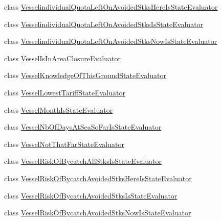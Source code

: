 \begin{DoxyCompactItemize}
\item 
class \mbox{\hyperlink{classdtree_1_1vessels_1_1_vesselindividual_quota_left_on_avoided_stks_here_is_state_evaluator}{Vesselindividual\+Quota\+Left\+On\+Avoided\+Stks\+Here\+Is\+State\+Evaluator}}
\item 
class \mbox{\hyperlink{classdtree_1_1vessels_1_1_vesselindividual_quota_left_on_avoided_stks_is_state_evaluator}{Vesselindividual\+Quota\+Left\+On\+Avoided\+Stks\+Is\+State\+Evaluator}}
\item 
class \mbox{\hyperlink{classdtree_1_1vessels_1_1_vesselindividual_quota_left_on_avoided_stks_now_is_state_evaluator}{Vesselindividual\+Quota\+Left\+On\+Avoided\+Stks\+Now\+Is\+State\+Evaluator}}
\item 
class \mbox{\hyperlink{classdtree_1_1vessels_1_1_vessel_is_in_area_closure_evaluator}{Vessel\+Is\+In\+Area\+Closure\+Evaluator}}
\item 
class \mbox{\hyperlink{classdtree_1_1vessels_1_1_vessel_knowledge_of_this_ground_state_evaluator}{Vessel\+Knowledge\+Of\+This\+Ground\+State\+Evaluator}}
\item 
class \mbox{\hyperlink{classdtree_1_1vessels_1_1_vessel_lowest_tariff_state_evaluator}{Vessel\+Lowest\+Tariff\+State\+Evaluator}}
\item 
class \mbox{\hyperlink{classdtree_1_1vessels_1_1_vessel_month_is_state_evaluator}{Vessel\+Month\+Is\+State\+Evaluator}}
\item 
class \mbox{\hyperlink{classdtree_1_1vessels_1_1_vessel_nb_of_days_at_sea_so_far_is_state_evaluator}{Vessel\+Nb\+Of\+Days\+At\+Sea\+So\+Far\+Is\+State\+Evaluator}}
\item 
class \mbox{\hyperlink{classdtree_1_1vessels_1_1_vessel_not_that_far_state_evaluator}{Vessel\+Not\+That\+Far\+State\+Evaluator}}
\item 
class \mbox{\hyperlink{classdtree_1_1vessels_1_1_vessel_risk_of_bycatch_all_stks_is_state_evaluator}{Vessel\+Risk\+Of\+Bycatch\+All\+Stks\+Is\+State\+Evaluator}}
\item 
class \mbox{\hyperlink{classdtree_1_1vessels_1_1_vessel_risk_of_bycatch_avoided_stks_here_is_state_evaluator}{Vessel\+Risk\+Of\+Bycatch\+Avoided\+Stks\+Here\+Is\+State\+Evaluator}}
\item 
class \mbox{\hyperlink{classdtree_1_1vessels_1_1_vessel_risk_of_bycatch_avoided_stks_is_state_evaluator}{Vessel\+Risk\+Of\+Bycatch\+Avoided\+Stks\+Is\+State\+Evaluator}}
\item 
class \mbox{\hyperlink{classdtree_1_1vessels_1_1_vessel_risk_of_bycatch_avoided_stks_now_is_state_evaluator}{Vessel\+Risk\+Of\+Bycatch\+Avoided\+Stks\+Now\+Is\+State\+Evaluator}}

\end{DoxyCompactItemize}
